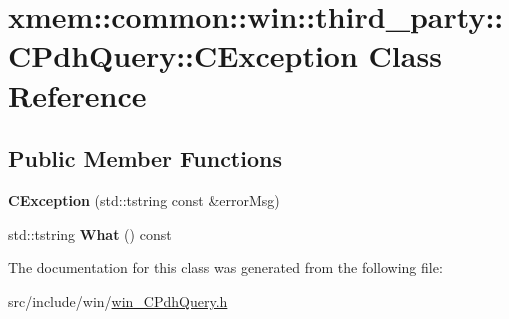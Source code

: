 \hypertarget{classxmem_1_1common_1_1win_1_1third__party_1_1_c_pdh_query_1_1_c_exception}{}\section{xmem\+:\+:common\+:\+:win\+:\+:third\+\_\+party\+:\+:C\+Pdh\+Query\+:\+:C\+Exception Class Reference}
\label{classxmem_1_1common_1_1win_1_1third__party_1_1_c_pdh_query_1_1_c_exception}
\subsection*{Public Member Functions}
\begin{DoxyCompactItemize}
\item 
\hypertarget{classxmem_1_1common_1_1win_1_1third__party_1_1_c_pdh_query_1_1_c_exception_a9dfc0cf08b098d834f73c0b9bc09e747}{}{\bfseries C\+Exception} (std\+::tstring const \&error\+Msg)\label{classxmem_1_1common_1_1win_1_1third__party_1_1_c_pdh_query_1_1_c_exception_a9dfc0cf08b098d834f73c0b9bc09e747}

\item 
\hypertarget{classxmem_1_1common_1_1win_1_1third__party_1_1_c_pdh_query_1_1_c_exception_ac8c712fa04667506d4f362bba183a812}{}std\+::tstring {\bfseries What} () const \label{classxmem_1_1common_1_1win_1_1third__party_1_1_c_pdh_query_1_1_c_exception_ac8c712fa04667506d4f362bba183a812}

\end{DoxyCompactItemize}


The documentation for this class was generated from the following file\+:\begin{DoxyCompactItemize}
\item 
src/include/win/\hyperlink{win___c_pdh_query_8h}{win\+\_\+\+C\+Pdh\+Query.\+h}\end{DoxyCompactItemize}
